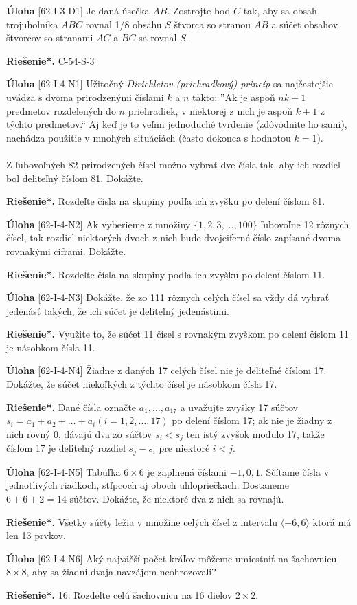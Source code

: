 \documentclass{article}
\newcommand{\rieh}{\textbf{Riešenie*.} }
\newcommand{\problem}[3]{
  \begin{tcolorbox}[breakable,notitle,boxrule=0pt,colback=light-gray,colframe=light-gray]
    \textbf{Úloha}
    [#1] #2
  \end{tcolorbox}
  \noindent#3
}
\begin{document}
\problem{62-I-3-D1}{
Je daná úsečka $AB$. Zostrojte bod $C$ tak, aby sa obsah trojuholníka $ABC$ rovnal 1/8 obsahu $S$ štvorca so stranou $AB$ a súčet obsahov štvorcov so stranami $AC$ a $BC$ sa rovnal $S$.
}{
\rieh C-54-S-3
}

\problem{62-I-4-N1}{
Užitočný \textit{Dirichletov (priehradkový) princíp} sa najčastejšie uvádza s dvoma prirodzenými číslami $k$ a $n$ takto: ”Ak je aspoň $nk+1$ predmetov rozdelených do $n$ priehradiek, v niektorej z nich je aspoň $k + 1$ z týchto predmetov.“ Aj keď je to veľmi jednoduché tvrdenie (zdôvodnite ho sami), nachádza použitie v mnohých situáciách (často dokonca s hodnotou $k = 1$).\\
\\
Z ľubovoľných 82 prirodzených čísel možno vybrať dve čísla tak, aby ich rozdiel bol deliteľný číslom 81. Dokážte.
}{
\rieh Rozdeľte čísla na skupiny podľa ich zvyšku po delení číslom 81.
}


\problem{62-I-4-N2}{
Ak vyberieme z množiny $\{1, 2, 3, \ldots , 100\}$ ľubovoľne 12 rôznych čísel, tak rozdiel niektorých dvoch z nich bude dvojciferné číslo zapísané dvoma rovnakými ciframi. Dokážte.
}{
\rieh Rozdeľte čísla na skupiny podľa ich zvyšku po delení číslom 11.
}


\problem{62-I-4-N3}{
Dokážte, že zo 111 rôznych celých čísel sa vždy dá vybrať jedenásť takých, že ich súčet je deliteľný jedenástimi.
}{
\rieh Využite to, že súčet 11 čísel s rovnakým zvyškom po delení číslom 11 je násobkom čísla 11.
}


\problem{62-I-4-N4}{
Žiadne z daných 17 celých čísel nie je deliteľné číslom 17. Dokážte, že súčet niekoľkých z týchto čísel je násobkom čísla 17.
}{
\rieh Dané čísla označte $a_1, \ldots, a_{17}$ a uvažujte zvyšky 17 súčtov $s_i = a_1 + a_2 + \ldots + a_i (i = 1, 2, \ldots, 17)$ po delení číslom 17; ak nie je žiadny z nich rovný 0, dávajú dva zo súčtov $s_i < s_j$ ten istý zvyšok modulo 17, takže číslom 17 je deliteľný rozdiel $s_j - s_i$ pre niektoré $i < j$.
}


\problem{62-I-4-N5}{
Tabuľka $6 \times 6$ je zaplnená číslami $-1, 0, 1$. Sčítame čísla v jednotlivých riadkoch, stľpcoch aj oboch uhlopriečkach. Dostaneme $6+6+2 = 14$ súčtov. Dokážte, že niektoré dva z nich sa rovnajú.
}{
\rieh Všetky súčty ležia v množine celých čísel z intervalu $\langle -6, 6 \rangle$ ktorá má len 13 prvkov.
}

\problem{62-I-4-N6}{
Aký najväčší počet kráľov môžeme umiestniť na šachovnicu $8\times 8$, aby sa žiadni dvaja navzájom neohrozovali?
}{
\rieh 16. Rozdeľte celú šachovnicu na 16 dielov $2\times 2$.
}
\end{document}
